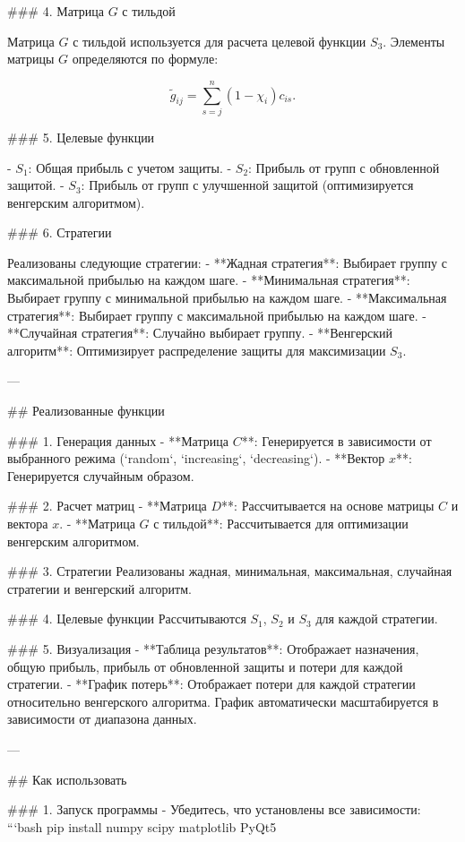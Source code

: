 ### 4. Матрица \( G \) с тильдой

Матрица \( G \) с тильдой используется для расчета целевой функции \( S_3 \). Элементы матрицы \( G \) определяются по формуле:

$$
\widetilde{g}_{ij} = \sum_{s=j}^{n} (1 - \chi_i)c_{is}.
$$

### 5. Целевые функции

- \( S_1 \): Общая прибыль с учетом защиты.
- \( S_2 \): Прибыль от групп с обновленной защитой.
- \( S_3 \): Прибыль от групп с улучшенной защитой (оптимизируется венгерским алгоритмом).

### 6. Стратегии

Реализованы следующие стратегии:
- **Жадная стратегия**: Выбирает группу с максимальной прибылью на каждом шаге.
- **Минимальная стратегия**: Выбирает группу с минимальной прибылью на каждом шаге.
- **Максимальная стратегия**: Выбирает группу с максимальной прибылью на каждом шаге.
- **Случайная стратегия**: Случайно выбирает группу.
- **Венгерский алгоритм**: Оптимизирует распределение защиты для максимизации \( S_3 \).

---

## Реализованные функции

### 1. Генерация данных
- **Матрица \( C \)**: Генерируется в зависимости от выбранного режима (`random`, `increasing`, `decreasing`).
- **Вектор \( x \)**: Генерируется случайным образом.

### 2. Расчет матриц
- **Матрица \( D \)**: Рассчитывается на основе матрицы \( C \) и вектора \( x \).
- **Матрица \( G \) с тильдой**: Рассчитывается для оптимизации венгерским алгоритмом.

### 3. Стратегии
Реализованы жадная, минимальная, максимальная, случайная стратегии и венгерский алгоритм.

### 4. Целевые функции
Рассчитываются \( S_1 \), \( S_2 \) и \( S_3 \) для каждой стратегии.

### 5. Визуализация
- **Таблица результатов**: Отображает назначения, общую прибыль, прибыль от обновленной защиты и потери для каждой стратегии.
- **График потерь**: Отображает потери для каждой стратегии относительно венгерского алгоритма. График автоматически масштабируется в зависимости от диапазона данных.

---

## Как использовать

### 1. Запуск программы
- Убедитесь, что установлены все зависимости:
  ```bash
  pip install numpy scipy matplotlib PyQt5
